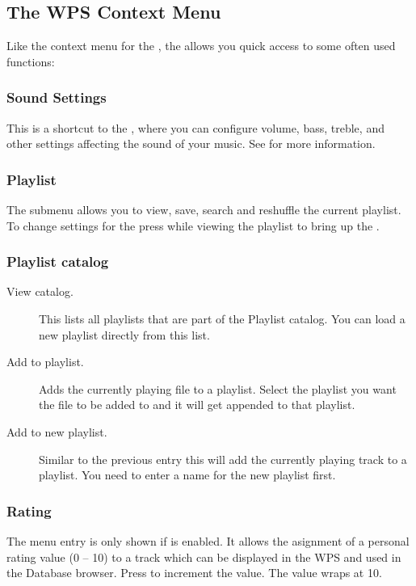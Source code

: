 \subsection{\label{sec:contextmenu}The WPS Context Menu}
Like the context menu for the , the  
allows you quick access to some often used functions:

\subsubsection{Sound Settings}
This is a shortcut to the , where you can configure volume,
bass, treble, and other settings affecting the sound of your music.  
See  for more information.

\subsubsection{Playlist}
The  submenu allows you to view, save, search and
reshuffle the current playlist. To change settings for the
 press \ActionStdMenu{} while viewing the playlist
to bring up the .
    
\subsubsection{Playlist catalog}
  \begin{description}
    \item [View catalog.] This lists all playlists that are part of the
    Playlist catalog. You can load a new playlist directly from this list.
    \item [Add to playlist.] Adds the currently playing file to a playlist.
    Select the playlist you want the file to be added to and it will get
    appended to that playlist.
    \item [Add to new playlist.] Similar to the previous entry this will
    add the currently playing track to a playlist. You need to enter a name
    for the new playlist first.
  \end{description}

\subsubsection{Rating}
The menu entry is only shown if  is
enabled. It allows the asignment of a personal rating value (0 -- 10)
to a track which can be displayed in the WPS and used in the Database
browser. Press \ButtonRight{} to increment the value. The value wraps at 10.

